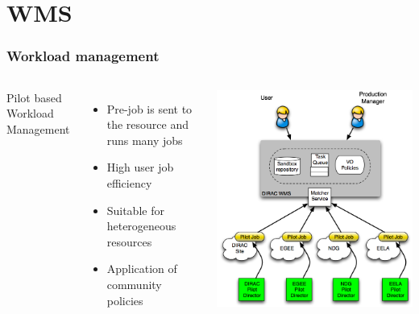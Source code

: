 \documentclass[14pt]{beamer}
\begin{document}
\section{WMS}
\begin{frame}
\frametitle{Workload management}
\begin{columns}
Pilot based Workload Management
\begin{itemize}
\item Pre-job is sent to the resource and runs many jobs
\item High user job efficiency
\item Suitable for heterogeneous resources
\item Application of community policies
\end{itemize}
\includegraphics[width=\textwidth]{diracwms.png}
\end{columns}
\end{frame}
\end{document}
